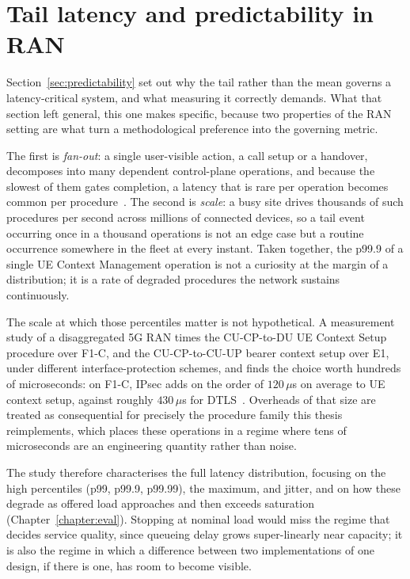 \documentclass[english,twoside,openright,a4paper,censored,csm,software-track-2020]{HYthesisML}
\begin{document}
\section{Tail latency and predictability in RAN}
Section~\ref{sec:predictability} set out why the tail rather than the mean governs a
latency-critical system, and what measuring it correctly demands. What that section left
general, this one makes specific, because two properties of the RAN setting are what turn a
methodological preference into the governing metric.

The first is \emph{fan-out}: a single user-visible action, a call setup or a handover,
decomposes into many dependent control-plane operations, and because the slowest of them gates
completion, a latency that is rare per operation becomes common per
procedure~\cite{dean2013tail}. The second is \emph{scale}: a busy site drives thousands of such
procedures per second across millions of connected devices, so a tail event occurring once in a
thousand operations is not an edge case but a routine occurrence somewhere in the fleet at
every instant. Taken together, the p99.9 of a single UE Context Management operation is not a
curiosity at the margin of a distribution; it is a rate of degraded procedures the network
sustains continuously.

The scale at which those percentiles matter is not hypothetical. A measurement study of a
disaggregated 5G RAN times the CU-CP-to-DU UE Context Setup procedure over F1-C, and the
CU-CP-to-CU-UP bearer context setup over E1, under different interface-protection schemes, and
finds the choice worth hundreds of microseconds: on F1-C, IPsec adds on the order of
$120\,\mu$s on average to UE context setup, against roughly $430\,\mu$s for
DTLS~\cite{michaelides2026ranlatency}. Overheads of that size are treated as consequential for
precisely the procedure family this thesis reimplements, which places these operations in a
regime where tens of microseconds are an engineering quantity rather than noise.

The study therefore characterises the full latency distribution, focusing on the high
percentiles (p99, p99.9, p99.99), the maximum, and jitter, and on how these degrade as offered
load approaches and then exceeds saturation (Chapter~\ref{chapter:eval}). Stopping at nominal
load would miss the regime that decides service quality, since queueing delay grows
super-linearly near capacity; it is also the regime in which a difference between two
implementations of one design, if there is one, has room to become visible.
\end{document}
